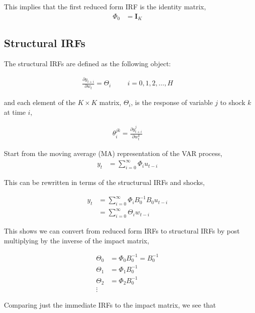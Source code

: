 \documentclass{article}
\newcommand*{\I}{\mathbf{I}}
\begin{document}
This implies that the first reduced form IRF is the identity matrix,
\begin{align*}
  \Phi_0 &= \I_K
\end{align*}

\subsection{Structural IRFs}

The structural IRFs are defined as the following object:

\begin{align*}
  \frac{\partial y_{t+i}}{\partial w_t} = \Theta_i \hspace{1cm} i = 0, 1, 2, \dots, H
\end{align*}

and each element of the $K \times K$ matrix, $\Theta_i$, is the response of variable $j$ to shock $k$ at time $i$,

\begin{align*}
  \theta^{jk}_{i} = \frac{\partial y_{t+i}^j}{\partial w_t^k}
\end{align*}

Start from the moving average (MA) representation of the VAR process,
\begin{align*}
  y_t &= \sum_{i=0}^\infty \Phi_i u_{t-i}
\end{align*}

This can be rewritten in terms of the structurual IRFs and shocks,

\begin{align*}
  y_t &= \sum_{i=0}^\infty \Phi_i B_0^{-1} B_0 u_{t-i} 
  \\
  &= \sum_{i=0}^\infty \Theta_i w_{t-i}
\end{align*}

This shows we can convert from reduced form IRFs to structural IRFs by post multiplying by the inverse of the impact matrix,

\begin{align*}
  \Theta_0 &= \Phi_0 B_0^{-1} = B_0^{-1}
  \\
  \Theta_1 &= \Phi_1 B_0^{-1}
  \\
  \Theta_2 &= \Phi_2 B_0^{-1}
  \\
  \vdots
\end{align*}

Comparing just the immediate IRFs to the impact matrix, we see that
\end{document}
